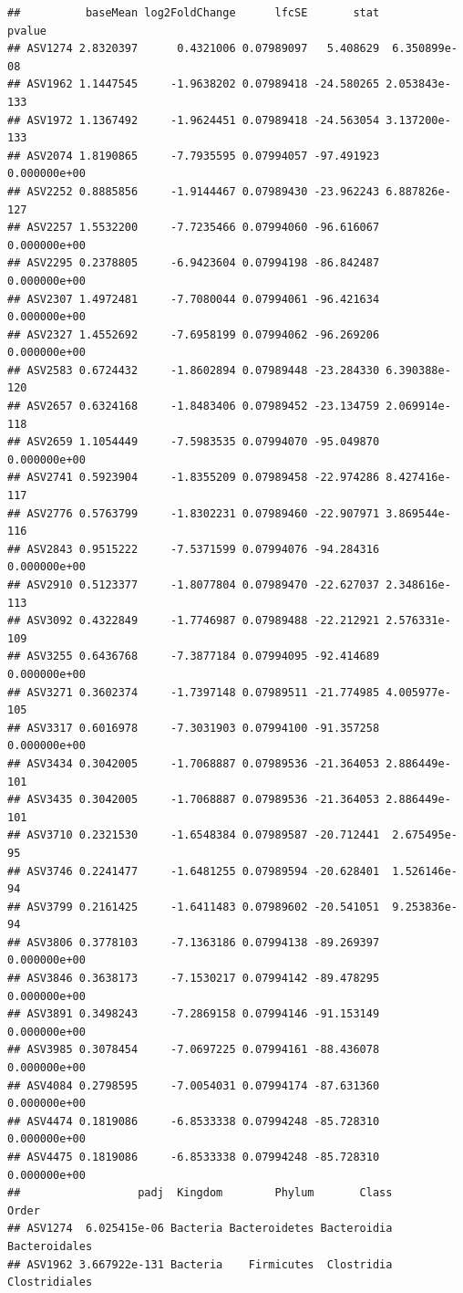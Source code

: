 \documentclass[]{article}
\begin{document}
\begin{verbatim}
##          baseMean log2FoldChange      lfcSE       stat        pvalue
## ASV1274 2.8320397      0.4321006 0.07989097   5.408629  6.350899e-08
## ASV1962 1.1447545     -1.9638202 0.07989418 -24.580265 2.053843e-133
## ASV1972 1.1367492     -1.9624451 0.07989418 -24.563054 3.137200e-133
## ASV2074 1.8190865     -7.7935595 0.07994057 -97.491923  0.000000e+00
## ASV2252 0.8885856     -1.9144467 0.07989430 -23.962243 6.887826e-127
## ASV2257 1.5532200     -7.7235466 0.07994060 -96.616067  0.000000e+00
## ASV2295 0.2378805     -6.9423604 0.07994198 -86.842487  0.000000e+00
## ASV2307 1.4972481     -7.7080044 0.07994061 -96.421634  0.000000e+00
## ASV2327 1.4552692     -7.6958199 0.07994062 -96.269206  0.000000e+00
## ASV2583 0.6724432     -1.8602894 0.07989448 -23.284330 6.390388e-120
## ASV2657 0.6324168     -1.8483406 0.07989452 -23.134759 2.069914e-118
## ASV2659 1.1054449     -7.5983535 0.07994070 -95.049870  0.000000e+00
## ASV2741 0.5923904     -1.8355209 0.07989458 -22.974286 8.427416e-117
## ASV2776 0.5763799     -1.8302231 0.07989460 -22.907971 3.869544e-116
## ASV2843 0.9515222     -7.5371599 0.07994076 -94.284316  0.000000e+00
## ASV2910 0.5123377     -1.8077804 0.07989470 -22.627037 2.348616e-113
## ASV3092 0.4322849     -1.7746987 0.07989488 -22.212921 2.576331e-109
## ASV3255 0.6436768     -7.3877184 0.07994095 -92.414689  0.000000e+00
## ASV3271 0.3602374     -1.7397148 0.07989511 -21.774985 4.005977e-105
## ASV3317 0.6016978     -7.3031903 0.07994100 -91.357258  0.000000e+00
## ASV3434 0.3042005     -1.7068887 0.07989536 -21.364053 2.886449e-101
## ASV3435 0.3042005     -1.7068887 0.07989536 -21.364053 2.886449e-101
## ASV3710 0.2321530     -1.6548384 0.07989587 -20.712441  2.675495e-95
## ASV3746 0.2241477     -1.6481255 0.07989594 -20.628401  1.526146e-94
## ASV3799 0.2161425     -1.6411483 0.07989602 -20.541051  9.253836e-94
## ASV3806 0.3778103     -7.1363186 0.07994138 -89.269397  0.000000e+00
## ASV3846 0.3638173     -7.1530217 0.07994142 -89.478295  0.000000e+00
## ASV3891 0.3498243     -7.2869158 0.07994146 -91.153149  0.000000e+00
## ASV3985 0.3078454     -7.0697225 0.07994161 -88.436078  0.000000e+00
## ASV4084 0.2798595     -7.0054031 0.07994174 -87.631360  0.000000e+00
## ASV4474 0.1819086     -6.8533338 0.07994248 -85.728310  0.000000e+00
## ASV4475 0.1819086     -6.8533338 0.07994248 -85.728310  0.000000e+00
##                  padj  Kingdom        Phylum       Class           Order
## ASV1274  6.025415e-06 Bacteria Bacteroidetes Bacteroidia   Bacteroidales
## ASV1962 3.667922e-131 Bacteria    Firmicutes  Clostridia   Clostridiales

\end{verbatim}
\end{document}
